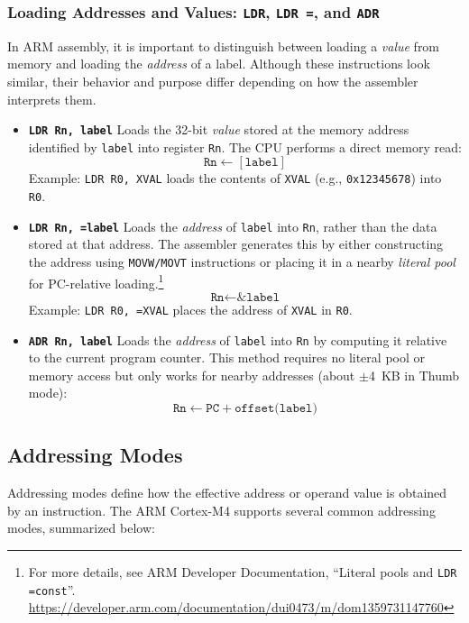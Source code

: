 \subsubsection{Loading Addresses and Values: \texttt{LDR}, \texttt{LDR =}, and \texttt{ADR}}

In ARM assembly, it is important to distinguish between loading a \emph{value} from memory and loading the \emph{address} of a label.  
Although these instructions look similar, their behavior and purpose differ depending on how the assembler interprets them.
\begin{itemize}[nosep]
    \item \textbf{\texttt{LDR Rn, label}}  
    Loads the 32-bit \emph{value} stored at the memory address identified by \texttt{label} into register \texttt{Rn}.  
    The CPU performs a direct memory read:
    \[
      \texttt{Rn} \leftarrow [\texttt{label}]
    \]
    Example: \texttt{LDR R0, XVAL} loads the contents of \texttt{XVAL} (e.g., \texttt{0x12345678}) into \texttt{R0}.
    
    \item \textbf{\texttt{LDR Rn, =label}}  
    Loads the \emph{address} of \texttt{label} into \texttt{Rn}, rather than the data stored at that address.  
    The assembler generates this by either constructing the address using \texttt{MOVW/MOVT} instructions or placing it in a nearby \emph{literal pool} for PC-relative loading.\footnote{For more details, see ARM Developer Documentation, “Literal pools and \texttt{LDR =const}”. \url{https://developer.arm.com/documentation/dui0473/m/dom1359731147760}}  
    \[
      \texttt{Rn} \leftarrow \texttt{\&label}
    \]
    Example: \texttt{LDR R0, =XVAL} places the address of \texttt{XVAL} in \texttt{R0}.
    
    \item \textbf{\texttt{ADR Rn, label}}  
    Loads the \emph{address} of \texttt{label} into \texttt{Rn} by computing it relative to the current program counter.  
    This method requires no literal pool or memory access but only works for nearby addresses (about $\pm$4~KB in Thumb mode):  
    \[
      \texttt{Rn} \leftarrow \texttt{PC} + \texttt{offset(label)}
    \]
\end{itemize}
\subsection{Addressing Modes}

Addressing modes define how the effective address or operand value is obtained by an instruction. 
The ARM Cortex-M4 supports several common addressing modes, summarized below:

